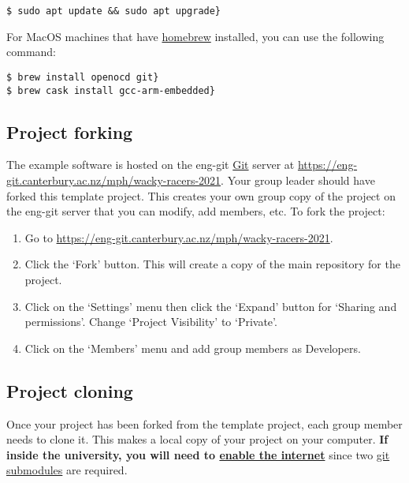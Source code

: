 \begin{verbatim}
$ sudo apt update && sudo apt upgrade}
\end{verbatim}

For MacOS machines that have \href{https://brew.sh}{homebrew} installed,
you can use the following command:

\begin{verbatim}
$ brew install openocd git}
$ brew cask install gcc-arm-embedded}
\end{verbatim}

\subsection{Project forking}
\label{project-forking}

The example software is hosted on the eng-git \url{Git} server at
\href{https://eng-git.canterbury.ac.nz/mph/wacky-racers-2021}{\url{https://eng-git.canterbury.ac.nz/mph/wacky-racers-2021}}.
Your group leader should have forked this template project. This creates
your own group copy of the project on the eng-git server that you can
modify, add members, etc. To fork the project:

\begin{enumerate}
\item
  Go to
  \href{https://eng-git.canterbury.ac.nz/mph/wacky-racers-2021}{\url{https://eng-git.canterbury.ac.nz/mph/wacky-racers-2021}}.
\item
  Click the `Fork' button. This will create a copy of the main repository
  for the project.
\item
  Click on the `Settings' menu then click the `Expand' button for
  `Sharing and permissions'. Change `Project Visibility' to `Private'.
\item
  Click on the `Members' menu and add group members as Developers.
\end{enumerate}

\subsection{Project cloning}
\label{project-cloning}

Once your project has been forked from the template project, each group
member needs to clone it. This makes a local copy of your project on
your computer. \textbf{If inside the university, you will need to
\href{UC_internet_enabler}{enable the internet}} since two
\href{git_submodules}{git submodules} are required.

